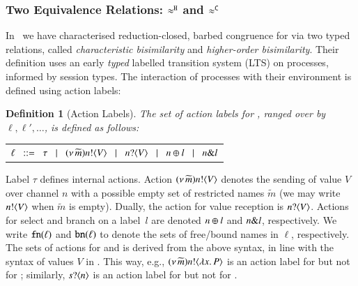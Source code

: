 \documentclass[preprint,11pt]{elsarticle}
\newtheorem{definition}{Definition}[section]
\begin{document}
{{\subsubsection{Two Equivalence Relations: $\approx^\mathtt{H}$ and $\approx^\mathtt{C}$}\label{ss:equiv}
In~\cite{characteristic_bis,KouzapasPY17} we have characterised
reduction-closed, barbed congruence for \HOp
via two typed relations, called
{\em characteristic bisimilarity}
and 
\emph{higher-order bisimilarity}.
Their definition 
uses an early \emph{typed}
labelled transition system (LTS) on processes, informed by session
types. 
The interaction of processes with their environment is defined using action labels:
%
\begin{definition}[Action Labels]\label{d:labels}
The set of action labels for \HOp, ranged over by $\ell, \ell', \ldots$, is defined as follows:
\begin{center}
	\begin{tabular}{l}
		$\ell
			\;\;::=\;\;  \tau 
			\;\;\;|\;\;\;	(\nu\, \widetilde{m}) n ! \langle V \rangle
			\;\;\;|\;\;\;	n ? \langle V \rangle 
			\;\;\;|\;\;\;	n \oplus l 
			\;\;\;|\;\;\;	n \& l$
	\end{tabular}
\end{center}
\end{definition}
%
\noi 
Label $\tau$ defines internal actions.
Action
$(\nu\, \widetilde{m}) n ! \langle V \rangle$
denotes the sending of value $V$
over channel $n$ with a possible empty set of restricted names
$\widetilde{m}$ 
(we may write $n ! \langle V \rangle$ when $\widetilde{m}$ is empty).
Dually, the action for value reception is 
$n ? \langle V \rangle$.
Actions for select and branch on
a label~$l$ are denoted $n \oplus l$ and $n \& l$, respectively.
We write $\mathtt{fn}(\ell)$ and $\mathtt{bn}(\ell)$ to denote the
sets of free/bound names in $\ell$, respectively.
The sets of actions for \HO and \sessp is derived from the above syntax, in line with the syntax of values $V$ in .
This way, e.g., $(\nu\, \widetilde{m}) n ! \langle \lambda x.\,P \rangle$ is an action label for \HO but not for \sessp;
similarly, $s ? \langle n \rangle$ is an action label for \sessp but not for \HO.


}}
\end{document}
